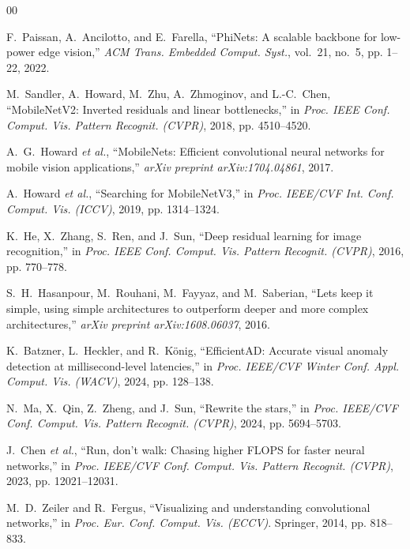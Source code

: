 \documentclass[conference]{IEEEtran}
\begin{document}
\begingroup
\footnotesize
\setlength{\parskip}{0pt}
\begin{thebibliography}{00}
\setlength{\itemsep}{0.0pt plus 0.1pt}
\setlength{\parsep}{0pt}
\setlength{\itemsep}{0.8pt plus 0.4pt minus 0.4pt}

F.~Paissan, A.~Ancilotto, and E.~Farella, ``{PhiNets}: A scalable backbone for low-power edge vision,'' \emph{ACM Trans. Embedded Comput. Syst.}, vol.~21, no.~5, pp. 1--22, 2022.

M.~Sandler, A.~Howard, M.~Zhu, A.~Zhmoginov, and L.-C.~Chen, ``{MobileNetV2}: Inverted residuals and linear bottlenecks,'' in \emph{Proc. IEEE Conf. Comput. Vis. Pattern Recognit. (CVPR)}, 2018, pp. 4510--4520.

A.~G.~Howard \emph{et al.}, ``{MobileNets}: Efficient convolutional neural networks for mobile vision applications,'' \emph{arXiv preprint arXiv:1704.04861}, 2017.

A.~Howard \emph{et al.}, ``Searching for {MobileNetV3},'' in \emph{Proc. IEEE/CVF Int. Conf. Comput. Vis. (ICCV)}, 2019, pp. 1314--1324.

K.~He, X.~Zhang, S.~Ren, and J.~Sun, ``Deep residual learning for image recognition,'' in \emph{Proc. IEEE Conf. Comput. Vis. Pattern Recognit. (CVPR)}, 2016, pp. 770--778.

S.~H.~Hasanpour, M.~Rouhani, M.~Fayyaz, and M.~Saberian, ``Lets keep it simple, using simple architectures to outperform deeper and more complex architectures,'' \emph{arXiv preprint arXiv:1608.06037}, 2016.

K.~Batzner, L.~Heckler, and R.~K{\"o}nig, ``{EfficientAD}: Accurate visual anomaly detection at millisecond-level latencies,'' in \emph{Proc. IEEE/CVF Winter Conf. Appl. Comput. Vis. (WACV)}, 2024, pp. 128--138.

N.~Ma, X.~Qin, Z.~Zheng, and J.~Sun, ``Rewrite the stars,'' in \emph{Proc. IEEE/CVF Conf. Comput. Vis. Pattern Recognit. (CVPR)}, 2024, pp. 5694--5703.

J.~Chen \emph{et al.}, ``Run, don't walk: Chasing higher {FLOPS} for faster neural networks,'' in \emph{Proc. IEEE/CVF Conf. Comput. Vis. Pattern Recognit. (CVPR)}, 2023, pp. 12021--12031.

M.~D.~Zeiler and R.~Fergus, ``Visualizing and understanding convolutional networks,'' in \emph{Proc. Eur. Conf. Comput. Vis. (ECCV)}. Springer, 2014, pp. 818--833.


\end{thebibliography}
\end{document}
